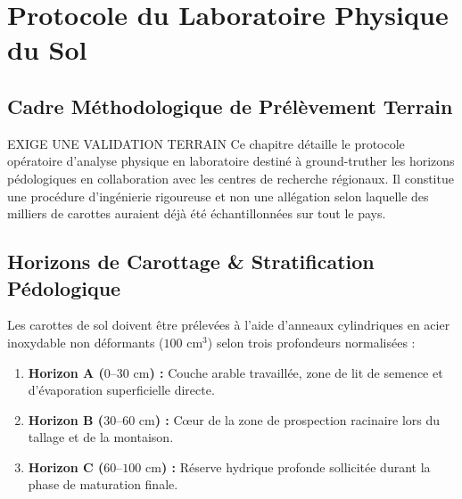 \documentclass[11pt,a4paper,oneside]{report}
\begin{document}
\chapter{Protocole du Laboratoire Physique du Sol}

\section{Cadre Méthodologique de Prélèvement Terrain}
\begin{evidencebox}{EXIGE UNE VALIDATION TERRAIN}
Ce chapitre détaille le protocole opératoire d'analyse physique en laboratoire destiné à ground-truther les horizons pédologiques en collaboration avec les centres de recherche régionaux. Il constitue une procédure d'ingénierie rigoureuse et non une allégation selon laquelle des milliers de carottes auraient déjà été échantillonnées sur tout le pays.
\end{evidencebox}

\section{Horizons de Carottage \& Stratification Pédologique}
Les carottes de sol doivent être prélevées à l'aide d'anneaux cylindriques en acier inoxydable non déformants ($100\text{ cm}^3$) selon trois profondeurs normalisées :
\begin{enumerate}
    \item \textbf{Horizon A ($0–30\text{ cm}$) :} Couche arable travaillée, zone de lit de semence et d'évaporation superficielle directe.
    \item \textbf{Horizon B ($30–60\text{ cm}$) :} Cœur de la zone de prospection racinaire lors du tallage et de la montaison.
    \item \textbf{Horizon C ($60–100\text{ cm}$) :} Réserve hydrique profonde sollicitée durant la phase de maturation finale.
\end{enumerate}
\end{document}
